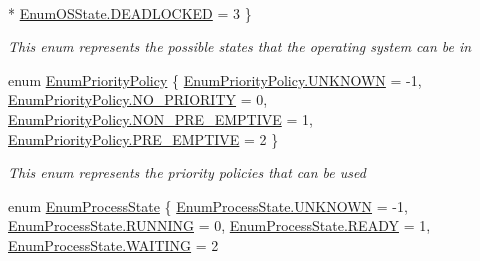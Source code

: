 \begin{DoxyCompactItemize}
\\*
\hyperlink{namespace_c_p_u___o_s___simulator_1_1_operating___system_a03a98a403abc737c106a8f92db5bffc1a0550134156d1220fe47b905f3da1080f}{Enum\+O\+S\+State.\+D\+E\+A\+D\+L\+O\+C\+K\+E\+D} = 3
 \}\begin{DoxyCompactList}\small\item\em This enum represents the possible states that the operating system can be in \end{DoxyCompactList}
\item 
enum \hyperlink{namespace_c_p_u___o_s___simulator_1_1_operating___system_a3a9286a473bd079e9c65908c0378fa00}{Enum\+Priority\+Policy} \{ \hyperlink{namespace_c_p_u___o_s___simulator_1_1_operating___system_a3a9286a473bd079e9c65908c0378fa00a696b031073e74bf2cb98e5ef201d4aa3}{Enum\+Priority\+Policy.\+U\+N\+K\+N\+O\+W\+N} = -\/1, 
\hyperlink{namespace_c_p_u___o_s___simulator_1_1_operating___system_a3a9286a473bd079e9c65908c0378fa00a9f68f1d26dd059f9a73e5f66a83bef80}{Enum\+Priority\+Policy.\+N\+O\+\_\+\+P\+R\+I\+O\+R\+I\+T\+Y} = 0, 
\hyperlink{namespace_c_p_u___o_s___simulator_1_1_operating___system_a3a9286a473bd079e9c65908c0378fa00a991a81df1486f1b97a90776f3026ff96}{Enum\+Priority\+Policy.\+N\+O\+N\+\_\+\+P\+R\+E\+\_\+\+E\+M\+P\+T\+I\+V\+E} = 1, 
\hyperlink{namespace_c_p_u___o_s___simulator_1_1_operating___system_a3a9286a473bd079e9c65908c0378fa00a952140b26aa6080871aab2eb7a96feb0}{Enum\+Priority\+Policy.\+P\+R\+E\+\_\+\+E\+M\+P\+T\+I\+V\+E} = 2
 \}\begin{DoxyCompactList}\small\item\em This enum represents the priority policies that can be used \end{DoxyCompactList}
\item 
enum \hyperlink{namespace_c_p_u___o_s___simulator_1_1_operating___system_a836ee2204e78fcb3a7dd6c3c942b1a24}{Enum\+Process\+State} \{ \hyperlink{namespace_c_p_u___o_s___simulator_1_1_operating___system_a836ee2204e78fcb3a7dd6c3c942b1a24a696b031073e74bf2cb98e5ef201d4aa3}{Enum\+Process\+State.\+U\+N\+K\+N\+O\+W\+N} = -\/1, 
\hyperlink{namespace_c_p_u___o_s___simulator_1_1_operating___system_a836ee2204e78fcb3a7dd6c3c942b1a24a43491564ebcfd38568918efbd6e840fd}{Enum\+Process\+State.\+R\+U\+N\+N\+I\+N\+G} = 0, 
\hyperlink{namespace_c_p_u___o_s___simulator_1_1_operating___system_a836ee2204e78fcb3a7dd6c3c942b1a24a2baa69eafc7204f3bd8648eba580c489}{Enum\+Process\+State.\+R\+E\+A\+D\+Y} = 1, 
\hyperlink{namespace_c_p_u___o_s___simulator_1_1_operating___system_a836ee2204e78fcb3a7dd6c3c942b1a24a1869d56535e8b1449a6da54ff5e11f50}{Enum\+Process\+State.\+W\+A\+I\+T\+I\+N\+G} = 2

\end{DoxyCompactItemize}
